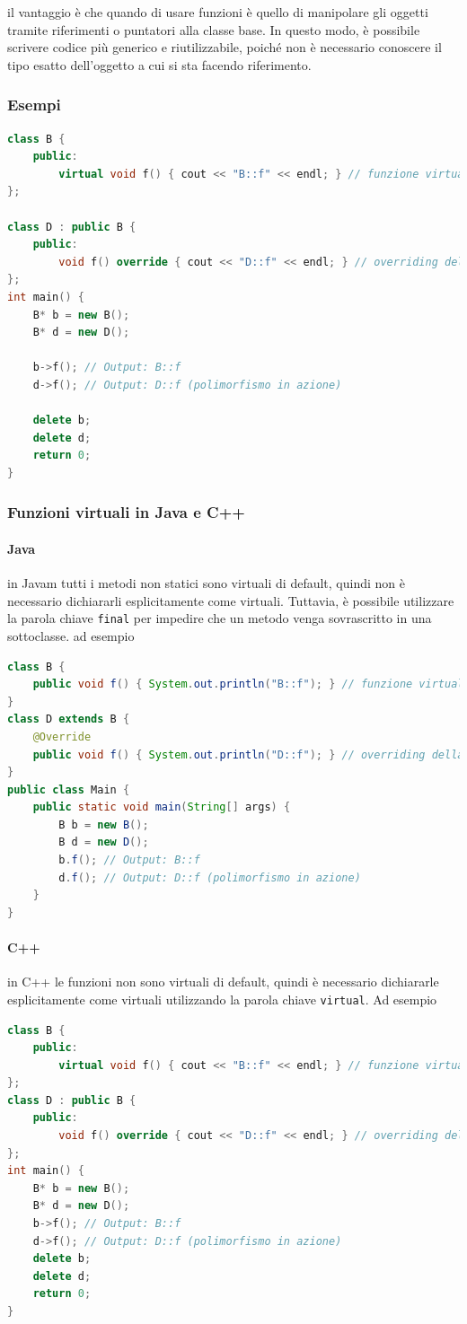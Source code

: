 il vantaggio è che quando di usare funzioni  è quello di manipolare gli oggetti tramite riferimenti o puntatori alla classe base. In questo modo, è possibile scrivere codice più generico e riutilizzabile, poiché non è necessario conoscere il tipo esatto dell'oggetto a cui si sta facendo riferimento.

\subsubsection{Esempi}

\begin{lstlisting}[language=C++]
class B {
    public:
        virtual void f() { cout << "B::f" << endl; } // funzione virtuale
};

class D : public B {
    public:
        void f() override { cout << "D::f" << endl; } // overriding della funzione virtuale
};
int main() {
    B* b = new B();
    B* d = new D();

    b->f(); // Output: B::f
    d->f(); // Output: D::f (polimorfismo in azione)

    delete b;
    delete d;
    return 0;
}
\end{lstlisting}

\subsubsection{Funzioni virtuali in Java e C++}
\paragraph{Java}
in Javam tutti i metodi non statici sono virtuali di default, quindi non è necessario dichiararli esplicitamente come virtuali. Tuttavia, è possibile utilizzare la parola chiave \texttt{final} per impedire che un metodo venga sovrascritto in una sottoclasse. ad esempio
\begin{lstlisting}[language=Java]
class B {
    public void f() { System.out.println("B::f"); } // funzione virtuale
}
class D extends B {
    @Override
    public void f() { System.out.println("D::f"); } // overriding della funzione virtuale
}
public class Main {
    public static void main(String[] args) {
        B b = new B();
        B d = new D();
        b.f(); // Output: B::f
        d.f(); // Output: D::f (polimorfismo in azione)
    }
}
\end{lstlisting}
\paragraph{C++}
in C++ le funzioni non sono virtuali di default, quindi è necessario dichiararle esplicitamente come virtuali utilizzando la parola chiave \texttt{virtual}. Ad esempio
\begin{lstlisting}[language=C++]
class B {
    public:
        virtual void f() { cout << "B::f" << endl; } // funzione virtuale
};  
class D : public B {
    public:
        void f() override { cout << "D::f" << endl; } // overriding della funzione virtuale
};
int main() {
    B* b = new B();
    B* d = new D();
    b->f(); // Output: B::f
    d->f(); // Output: D::f (polimorfismo in azione)
    delete b;
    delete d;
    return 0;
}
\end{lstlisting}
